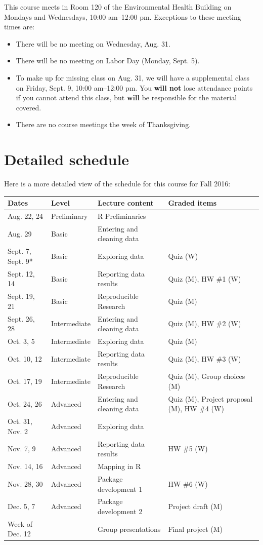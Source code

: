 \documentclass[]{book}
\providecommand{\tightlist}{%
  \setlength{\itemsep}{0pt}\setlength{\parskip}{0pt}}
\begin{document}
This course meets in Room 120 of the Environmental Health Building on
Mondays and Wednesdays, 10:00 am--12:00 pm. Exceptions to these meeting
times are:

\begin{itemize}
\tightlist
\item
  There will be no meeting on Wednesday, Aug. 31.
\item
  There will be no meeting on Labor Day (Monday, Sept. 5).
\item
  To make up for missing class on Aug. 31, we will have a supplemental
  class on Friday, Sept. 9, 10:00 am--12:00 pm. You \textbf{will not}
  lose attendance points if you cannot attend this class, but
  \textbf{will} be responsible for the material covered.
\item
  There are no course meetings the week of Thanksgiving.
\end{itemize}

\section{Detailed schedule}\label{detailed-schedule}

Here is a more detailed view of the schedule for this course for Fall
2016:

\begin{tabular}{l|l|l|l}
\hline
Dates & Level & Lecture content & Graded items\\
\hline
Aug. 22, 24 & Preliminary & R Preliminaries & \\
\hline
Aug. 29 & Basic & Entering and cleaning data & \\
\hline
Sept. 7, Sept. 9* & Basic & Exploring data & Quiz (W)\\
\hline
Sept. 12, 14 & Basic & Reporting data results & Quiz (M), HW \#1 (W)\\
\hline
Sept. 19, 21 & Basic & Reproducible Research & Quiz (M)\\
\hline
Sept. 26, 28 & Intermediate & Entering and cleaning data & Quiz (M), HW \#2 (W)\\
\hline
Oct. 3, 5 & Intermediate & Exploring data & Quiz (M)\\
\hline
Oct. 10, 12 & Intermediate & Reporting data results & Quiz (M), HW \#3 (W)\\
\hline
Oct. 17, 19 & Intermediate & Reproducible Research & Quiz (M), Group choices (M)\\
\hline
Oct. 24, 26 & Advanced & Entering and cleaning data & Quiz (M), Project proposal (M), HW \#4 (W)\\
\hline
Oct. 31, Nov. 2 & Advanced & Exploring data & \\
\hline
Nov. 7, 9 & Advanced & Reporting data results & HW \#5 (W)\\
\hline
Nov. 14, 16 & Advanced & Mapping in R & \\
\hline
Nov. 28, 30 & Advanced & Package development 1 & HW \#6 (W)\\
\hline
Dec. 5, 7 & Advanced & Package development 2 & Project draft (M)\\
\hline
Week of Dec. 12 &  & Group presentations & Final project (M)\\
\hline
\end{tabular}
\end{document}
